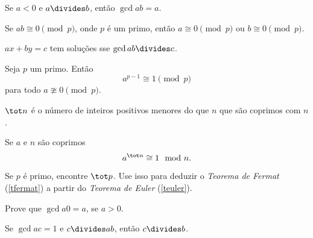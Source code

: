 \begin{exercise}
	Se $a < 0$ e $a\divides b$, então $\gcd a b = a$.
\end{exercise}

\begin{exercise}
	Se $ab\cong 0\pmod p$, onde $p$ é um primo, então $a\cong 0\pmod p$ ou $b\cong 0\pmod p$.
\end{exercise}

\begin{exercise}
	$ax + by = c$ tem soluções sse $\gcd a b\divides c$.
\end{exercise}

\begin{definition}
\label{tfermat}
	Seja $p$ um primo. Então
	$$
		a^{p - 1}\cong 1\pmod p
	$$
	para todo $a\ncong 0\pmod p$.
\end{definition}

\begin{definition}
	$\tot n$ é o número de inteiros positivos menores do que $n$ que são coprimos com $n$.
\end{definition}

\begin{definition}
\label{teuler}
	Se $a$ e $n$ são coprimos
	$$
		a^{\tot n}\cong 1\mod n.
	$$
\end{definition}

\begin{exercise}
	Se $p$ é primo, encontre $\tot p$. Use isso para deduzir o \emph {Teorema de Fermat} (\ref{tfermat}) a partir do \emph {Teorema de Euler} (\ref{teuler}).
\end{exercise}

\begin{homework}
	Prove que $\gcd a 0 = a$, se $a > 0$.
\end{homework}

\begin{homework}
	Se $\gcd a c = 1$ e $c\divides ab$, então $c\divides b$.
\end{homework}
